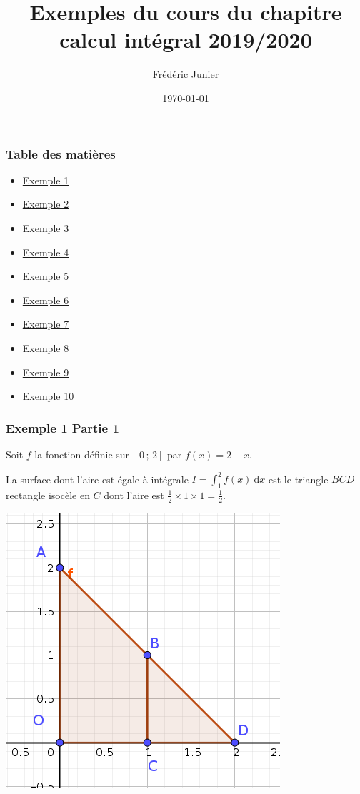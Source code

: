 \documentclass[11pt, hyperref={urlcolor=red,%
            linkcolor=blue, %
            colorlinks=true}]{beamer}
\title[exponentielle]{Exemples du cours du chapitre calcul int\'egral 2019/2020}
\author[F.Junier]{Fr\'ed\'eric Junier}
\institute[Le Parc]{{\centering Lyc\'ee du Parc \\
1 Boulevard Anatole France \\ 69006 Lyon }}
\date[\today]{\today}
\newcommand{\Interff}[2]{\left[#1\, ;\, #2\right]}
\newcommand{\dx}{\ensuremath{\text{d}x}}		%
\newcommand{\integralex}[3]{\int_{#1}^{#2} #3 \ \dx}
\begin{document}
\frame{\titlepage}




\begin{frame}
\frametitle{Table des matières}
\begin{itemize}
	\item \hyperlink{exemple1}{Exemple 1}
	\item \hyperlink{exemple2}{Exemple 2}
	\item \hyperlink{exemple3}{Exemple 3}
	\item \hyperlink{exemple4}{Exemple 4}
	\item \hyperlink{exemple5}{Exemple 5}
	\item \hyperlink{exemple6}{Exemple 6}
		\item \hyperlink{exemple7}{Exemple 7}
			\item \hyperlink{exemple8}{Exemple 8}
			\item \hyperlink{exemple9}{Exemple 9}
				\item \hyperlink{exemple10}{Exemple 10}
\end{itemize}

\end{frame}

\begin{frame}
\frametitle{Exemple 1 Partie 1}
\label{exemple1}

Soit $f$ la fonction définie sur $\Interff{0}{2}$ par $f(x)=2-x$.

La surface dont l'aire est égale à  intégrale  $I=\integralex{1}{2}{f(x)}$ est le triangle $BCD$  rectangle isocèle en $C$  dont l'aire est $\frac{1}{2} \times 1 \times 1=\frac{1}{2}$.

\begin{center}
\includegraphics[scale=0.4]{images/exemple1.png}
\end{center}

\end{frame}
\end{document}
